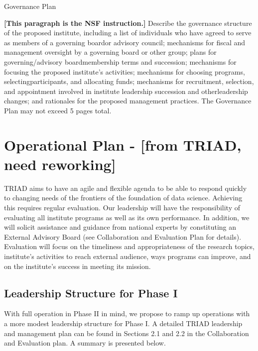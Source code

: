 \documentclass[12pt]{article}
\newcommand{\shrink}{\def\baselinestretch{0.90}\large\normalsize}
\begin{document}


\clearpage
\pagestyle{plain}
\normalbaselineskip=10.0pt

\begin{center}
Governance Plan
\end{center}

{\bf [This paragraph is the NSF instruction.]}
Describe the governance structure of the proposed institute, including a list of individuals who have agreed to serve as members of a governing boardor advisory council; mechanisms for fiscal and management oversight by a governing board or other group; plans for governing/advisory boardmembership terms and succession; mechanisms for focusing the proposed institute's activities; mechanisms for choosing programs, selectingparticipants, and allocating funds; mechanisms for recruitment, selection, and appointment involved in institute leadership succession and otherleadership changes; and rationales for the proposed management practices. The Governance Plan may not exceed 5 pages total.


\section{Operational Plan - [from TRIAD, need reworking]}
\label{sec:leadership}

TRIAD aims to have an agile and flexible agenda to be able to respond quickly to changing needs of the frontiers of the foundation of data science.
Achieving this requires regular evaluation.
Our leadership will have the responsibility of evaluating all institute programs as well as its own performance.
In addition, we will solicit assistance and guidance from national experts by constituting
an External Advisory Board (see Collaboration and Evaluation Plan for details).
Evaluation will focus on the timeliness and appropriateness of the research topics,
institute's activities to reach external audience, ways programs can improve, and on the institute's success in meeting its mission.

\vspace*{-1em}

\subsection{Leadership Structure for Phase I}
With full operation in Phase II in mind, we propose to ramp up operations with a more modest leadership structure for Phase I.
A detailed TRIAD leadership and management plan can be found in Sections 2.1 and 2.2 in the Collaboration and Evaluation plan.
A summary is presented below.
\end{document}
